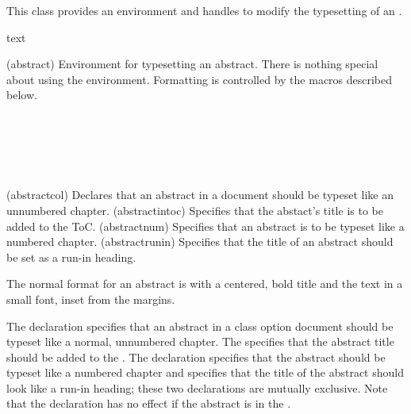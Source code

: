    This class provides an  environment and
handles to modify the typesetting of an .

\begin{syntax}
 text  \\
\end{syntax}
\glossary(abstract)%
  {}%
  {Environment for typesetting an abstract.}
There is nothing special about using the  environment. 
Formatting is controlled by the macros described below.

\begin{syntax}
\cmd{\abstractcol} \\
\cmd{\abstractintoc} \\
\cmd{\abstractnum} \\
\cmd{\abstractrunin} \\
\end{syntax}
\glossary(abstractcol)%
  {}%
  {Declares that an abstract in a  document should be
   typeset like an unnumbered chapter.}
\glossary(abstractintoc)%
  {}%
  {Specifies that the abstact's title is to be added to the ToC.} 
\glossary(abstractnum)%
  {}%
  {Specifies that an abstract is to be typeset like a numbered chapter.}
\glossary(abstractrunin)%
  {}%
  {Specifies that the title of an abstract should be set as a run-in heading.}

    The normal format for an abstract is with a centered, bold title
and the text in a small font, inset from the margins.

The \cmd{\abstractcol} declaration specifies that an abstract in a
 class option document should be typeset like a
normal, unnumbered chapter.
The \cmd{\abstractintoc} specifies that the abstract title should
be added to the \toc. The declaration \cmd{\abstractnum} specifies that the 
abstract should be typeset like a numbered chapter and 
\cmd{\abstractrunin} specifies that
the title of the abstract should look like a run-in heading; these two
declarations are mutually exclusive. Note that the \cmd{\abstractnum}
declaration has no effect if the abstract is in the \cmd{\frontmatter}.

